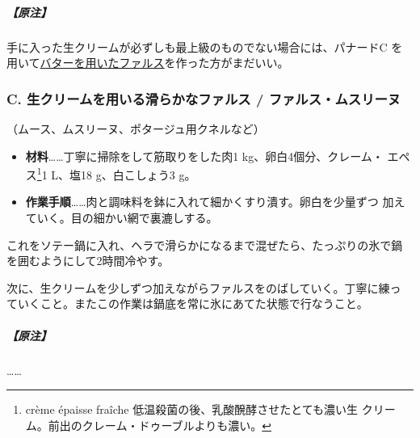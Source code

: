 \begin{recette}
\hypertarget{nota-farce-b}{%
\subparagraph{【原注】}\label{nota-farce-b}}

手に入った生クリームが必ずしも最上級のものでない場合には、パナードC を
用いて\protect\hyperlink{farce-a}{バターを用いたファルス}を作った方がまだいい。

\maeaki

\hypertarget{farce-c}{%
\subsubsection{C. 生クリームを用いる滑らかなファルス /
ファルス・ムスリーヌ}\label{farce-c}}



（ムース、ムスリーヌ、ポタージュ用クネルなど）

\begin{itemize}
\item
  \textbf{材料}\ldots{}\ldots{}丁寧に掃除をして筋取りをした肉1
  kg、卵白4個分、クレーム・ エペス\footnote{crème épaisse fraîche
    低温殺菌の後、乳酸醗酵させたとても濃い生
    クリーム。前出のクレーム・ドゥーブルよりも濃い。}1\undemi{} L、塩18
  g、白こしょう3 g。
\item
  \textbf{作業手順}\ldots{}\ldots{}肉と調味料を鉢に入れて細かくすり潰す。卵白を少量ずつ
  加えていく。目の細かい網で裏漉しする。
\end{itemize}

これをソテー鍋に入れ、ヘラで滑らかになるまで混ぜたら、たっぷりの氷で鍋
を囲むようにして2時間冷やす。

次に、生クリームを少しずつ加えながらファルスをのばしていく。丁寧に練っ
ていくこと。またこの作業は鍋底を常に氷にあてた状態で行なうこと。

\hypertarget{nota-farce-c}{%
\subparagraph{【原注】}\label{nota-farce-c}}

\ldots{}\ldots{}


\end{recette}
